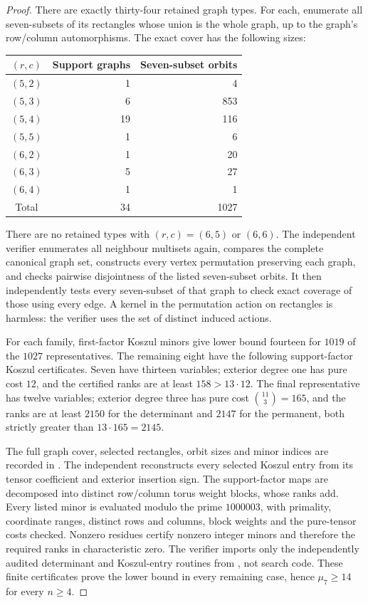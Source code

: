 \begin{proof}
There are exactly thirty-four retained graph types. For each,
enumerate all seven-subsets of its rectangles whose union is
the whole graph, up to the graph's row/column automorphisms.
The exact cover has the following sizes:
\begin{center}
\begin{tabular}{c|r|r}
$(r,c)$&Support graphs&Seven-subset orbits\\\hline
$(5,2)$&1&4\\
$(5,3)$&6&853\\
$(5,4)$&19&116\\
$(5,5)$&1&6\\
$(6,2)$&1&20\\
$(6,3)$&5&27\\
$(6,4)$&1&1\\\hline
Total&34&1027
\end{tabular}
\end{center}
There are no retained types with $(r,c)=(6,5)$ or $(6,6)$.
The independent verifier enumerates all neighbour multisets
again, compares the complete canonical graph set, constructs
every vertex permutation preserving each graph, and checks
pairwise disjointness of the listed seven-subset orbits.
It then independently tests every seven-subset of that graph
to check exact coverage of those using every edge. A kernel
in the permutation action on rectangles is harmless: the
verifier uses the set of distinct induced actions.

For each family, first-factor Koszul minors give lower bound
fourteen for $1019$ of the $1027$ representatives. The remaining
eight have the following support-factor Koszul certificates.
Seven have thirteen variables; exterior degree one has pure
cost $12$, and the certified ranks are at least $158>13\cdot12$.
The final representative has twelve variables; exterior degree
three has pure cost $\binom{11}{3}=165$, and the ranks are at
least $2150$ for the determinant and $2147$ for the permanent,
both strictly greater than $13\cdot165=2145$.

The full graph cover, selected rectangles, orbit sizes and
minor indices are recorded in .
The independent  reconstructs every
selected Koszul entry from its tensor coefficient and exterior
insertion sign. The support-factor maps are decomposed into
distinct row/column torus weight blocks, whose ranks add.
Every listed minor is evaluated modulo the prime $1000003$,
with primality, coordinate ranges, distinct rows and columns,
block weights and the pure-tensor costs checked. Nonzero
residues certify nonzero integer minors and therefore the
required ranks in characteristic zero. The verifier imports
only the independently audited determinant and Koszul-entry
routines from , not search code.
These finite certificates prove the lower bound in every
remaining case, hence $\mu_7\geq14$ for every $n\geq4$.


\end{proof}
